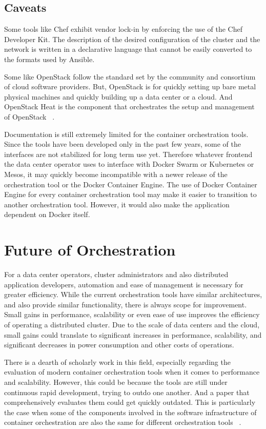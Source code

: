 \documentclass[10pt,twocolumn]{article}
\begin{document}
\subsection{Caveats}

Some tools like Chef exhibit vendor lock-in by enforcing the use of the Chef Developer Kit.
The description of the desired configuration of the cluster and the network is written in a declarative language that cannot be easily converted to the formats used by Ansible.

Some like OpenStack follow the standard set by the community and consortium of cloud software providers.
But, OpenStack is for quickly setting up bare metal physical machines and quickly building up a data center or a cloud.
And OpenStack Heat is the component that orchestrates the setup and management of OpenStack ~\cite{openstack}.

Documentation is still extremely limited for the container orchestration tools.
Since the tools have been developed only in the past few years, some of the interfaces are not stabilized for long term use yet.
Therefore whatever frontend the data center operator uses to interface with Docker Swarm or Kubernetes or Mesos, it may quickly become incompatible with a newer release of the orchestration tool or the Docker Container Engine.
The use of Docker Container Engine for every container orchestration tool may make it easier to transition to another orchestration tool.
However, it would also make the application dependent on Docker itself.

\section{Future of Orchestration}

For a data center operators, cluster administrators and also distributed application developers, automation and ease of management is necessary for greater efficiency.
While the current orchestration tools have similar architectures, and also provide similar functionality, there is always scope for improvement.
Small gains in performance, scalability or even ease of use improves the efficiency of operating a distributed cluster.
Due to the scale of data centers and the cloud, small gains could translate to significant increases in performance, scalability, and significant decreases in power consumption and other costs of operations.

There is a dearth of scholarly work in this field, especially regarding the evaluation of modern container orchestration tools when it comes to performance and scalability.
However, this could be because the tools are still under continuous rapid development, trying to outdo one another.
And a paper that comprehensively evaluates them could get quickly outdated.
This is particularly the case when some of the components involved in the software infrastructure of container orchestration are also the same for different orchestration tools ~\cite{intro_docker}.
\end{document}
